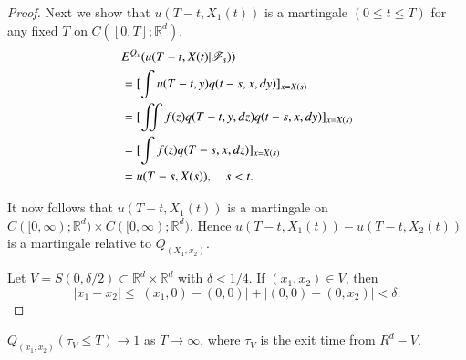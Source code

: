 \begin{proof}
Next we show that $u(T-t,X_{1}(t))$ is a martingale $(0\leq t\leq T)$
for any fixed $T$ on $C([0,T];\mathbb{R}^{d})$.
\begin{align*}
& E^{Q_{x}}(u(T-t,X(t)|\mathscr{F}_{s}))\\
& =[\int u(T-t,y)q(t-s,x,dy)]_{x=X(s)}\\
& =[\iint f(z)q(T-t,y,dz)q(t-s,x,dy)]_{x=X(s)}\\
& =[\int f(z)q(T-s,x,dz)]_{x=X(s)}\\
& =u(T-s,X(s)),\quad s<t. 
\end{align*}\pageoriginale

It now follows that $u(T-t,X_{1}(t))$ is a martingale on
$C([0,\infty);\mathbb{R}^{d})\times
  C([0,\infty);\mathbb{R}^{d})$. Hence
    $u(T-t,X_{1}(t))-u(T-t,X_{2}(t))$ is a martingale relative to
    $Q_{(X_{1},x_{2})}$. 

Let $V=S(0,\delta/2)\subset \mathbb{R}^{d}\times \mathbb{R}^{d}$ with
$\delta<1/4$. If $(x_{1},x_{2})\in V$, then
$$
|x_{1}-x_{2}|\leq |(x_{1},0)-(0,0)|+|(0,0)-(0,x_{2})|<\delta.
$$
\end{proof}

\setcounter{claim}{0}
\begin{claim}\label{chap31-claim1}
$Q_{(x_{1},x_{2})}(\tau_{V}\leq T)\to 1$ as $T\to \infty$, where
  $\tau_{V}$ is the exit time from $R^{d}-V$.
\end{claim}

